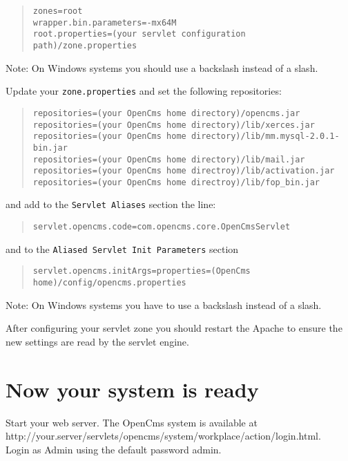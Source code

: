 \begin{quote}
\texttt{zones=root\\
wrapper.bin.parameters=-mx64M\\
root.properties=(your servlet configuration path)/zone.properties}
\end{quote}

Note: On Windows systems you should use a backslash instead of a slash. 

Update your \texttt{zone.properties} and set the following repositories: 

\begin{quote}
\begin{verbatim}
repositories=(your OpenCms home directory)/opencms.jar
repositories=(your OpenCms home directory)/lib/xerces.jar
repositories=(your OpenCms home directory)/lib/mm.mysql-2.0.1-bin.jar
repositories=(your OpenCms home directory)/lib/mail.jar
repositories=(your OpenCms home directroy)/lib/activation.jar
repositories=(your OpenCms home directroy)/lib/fop_bin.jar
\end{verbatim}
\end{quote}

and add to the \texttt{Servlet Aliases} section the line: 

\begin{quote}
\texttt{servlet.opencms.code=com.opencms.core.OpenCmsServlet} 
\end{quote}

and to the \texttt{Aliased Servlet Init Parameters} section 

\begin{quote}
\texttt{servlet.opencms.initArgs=properties=(OpenCms home)/config/opencms.properties}
\end{quote}
Note: On Windows systems you have to use a backslash instead of a slash. 

After configuring your servlet zone you should restart the Apache to
ensure the new settings are read by the servlet engine.

\section{Now your system is ready}

Start your web server. The OpenCms system is available at\\
http://your.server/servlets/opencms/system/workplace/action/login.html.\\
Login as Admin using the default password admin. 


